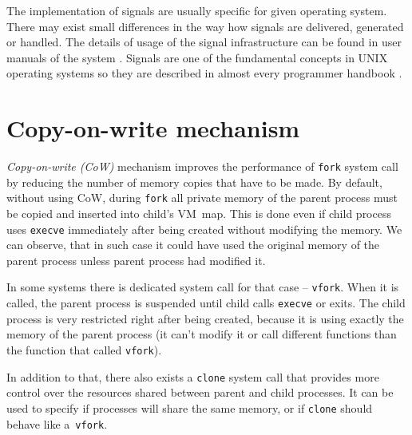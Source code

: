 The implementation of signals are usually specific for given operating system.
There may exist small differences in the way how signals are delivered, generated or handled.
The details of usage of the signal infrastructure can be found in user manuals of the system \cite{man:freebsd, man:linux, man:netbsd}.
Signals are one of the fundamental concepts in UNIX operating systems so they are described in almost every programmer handbook \cite{kerrisk, apue, vahalia}.

\section{Copy-on-write mechanism}

{\it Copy-on-write (CoW)} mechanism improves the performance of \texttt{fork} system call by reducing the number of memory copies that have to be made.
By default, without using CoW, during \texttt{fork} all private memory of the parent process must be copied and inserted into child's VM~map.
This is done even if child process uses \texttt{execve} immediately after being created without modifying the memory.
We can observe, that in such case it could have used the original memory of the parent process unless parent process had modified it.

In some systems there is dedicated system call for that case -- \texttt{vfork}.
When it is called, the parent process is suspended until child calls \texttt{execve} or exits.
The child process is very restricted right after being created, because it is using exactly the memory of the parent process
(it can't modify it or call different functions than the function that called \texttt{vfork}).

In addition to that, there also exists a \texttt{clone} system call that provides more control over the resources shared between parent and child processes.
It can be used to specify if processes will share the same memory, or if \texttt{clone} should behave like a~\texttt{vfork}.

